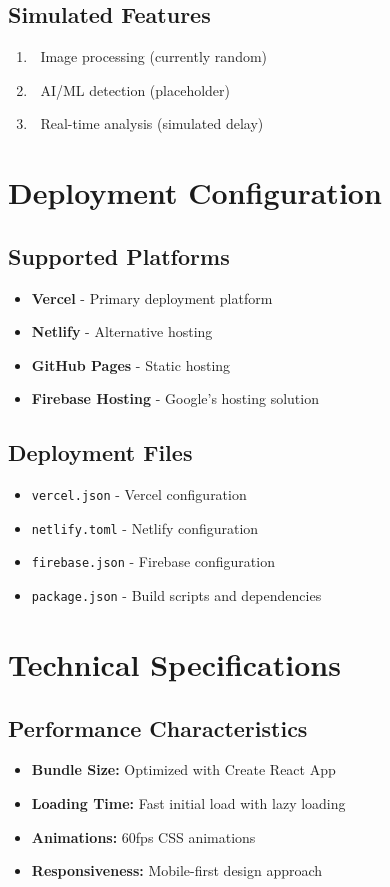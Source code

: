 \documentclass[12pt,a4paper]{article}
\begin{document}
\subsection{Simulated Features}
\begin{enumerate}
    \item 🔄 Image processing (currently random)
    \item 🔄 AI/ML detection (placeholder)
    \item 🔄 Real-time analysis (simulated delay)
\end{enumerate}

\section{Deployment Configuration}

\subsection{Supported Platforms}
\begin{itemize}
    \item \textbf{Vercel} - Primary deployment platform
    \item \textbf{Netlify} - Alternative hosting
    \item \textbf{GitHub Pages} - Static hosting
    \item \textbf{Firebase Hosting} - Google's hosting solution
\end{itemize}

\subsection{Deployment Files}
\begin{itemize}
    \item \texttt{vercel.json} - Vercel configuration
    \item \texttt{netlify.toml} - Netlify configuration
    \item \texttt{firebase.json} - Firebase configuration
    \item \texttt{package.json} - Build scripts and dependencies
\end{itemize}

\section{Technical Specifications}

\subsection{Performance Characteristics}
\begin{itemize}
    \item \textbf{Bundle Size:} Optimized with Create React App
    \item \textbf{Loading Time:} Fast initial load with lazy loading
    \item \textbf{Animations:} 60fps CSS animations
    \item \textbf{Responsiveness:} Mobile-first design approach
\end{itemize}
\end{document}
